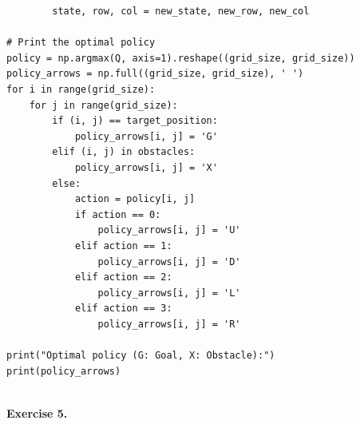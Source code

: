 \documentclass[letter,11pt]{article}
\begin{document}
\begin{lstlisting}
        state, row, col = new_state, new_row, new_col

# Print the optimal policy
policy = np.argmax(Q, axis=1).reshape((grid_size, grid_size))
policy_arrows = np.full((grid_size, grid_size), ' ')
for i in range(grid_size):
    for j in range(grid_size):
        if (i, j) == target_position:
            policy_arrows[i, j] = 'G'
        elif (i, j) in obstacles:
            policy_arrows[i, j] = 'X'
        else:
            action = policy[i, j]
            if action == 0:
                policy_arrows[i, j] = 'U'
            elif action == 1:
                policy_arrows[i, j] = 'D'
            elif action == 2:
                policy_arrows[i, j] = 'L'
            elif action == 3:
                policy_arrows[i, j] = 'R'

print("Optimal policy (G: Goal, X: Obstacle):")
print(policy_arrows)


\end{lstlisting}

\textbf{Exercise 5.}
\end{document}
